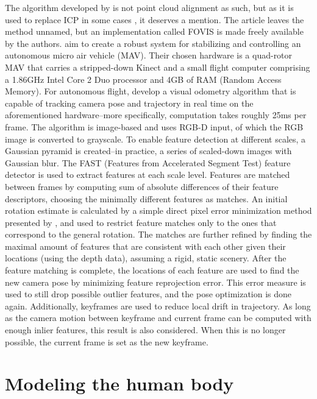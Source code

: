 The algorithm developed by \citet{huang2011visual} is not point cloud alignment as such, but as it is used to replace ICP in some cases \citep{Whelan12rssw}, it deserves a mention. The article leaves the method unnamed, but an implementation called FOVIS \citep{fovis} is made freely available by the authors. \citet{huang2011visual} aim to create a robust system for stabilizing and controlling an autonomous micro air vehicle (MAV). Their chosen hardware is a quad-rotor MAV that carries a stripped-down Kinect and a small flight computer comprising a 1.86GHz Intel Core 2 Duo processor and 4GB of RAM (Random Access Memory). For autonomous flight, \citeauthor{huang2011visual} develop a visual odometry algorithm that is capable of tracking camera pose and trajectory in real time on the aforementioned hardware--more specifically, computation takes roughly 25ms per frame. The algorithm is image-based and uses RGB-D input, of which the RGB image is converted to grayscale. To enable feature detection at different scales, a Gaussian pyramid is created--in practice, a series of scaled-down images with Gaussian blur. The FAST (Features from Accelerated Segment Test) feature detector \citep{rosten2006machine} is used to extract features at each scale level. Features are matched between frames by computing sum of absolute differences of their feature descriptors, choosing the minimally different features as matches. An initial rotation estimate is calculated by a simple direct pixel error minimization method presented by \citet{mei2009}, and used to restrict feature matches only to the ones that correspond to the general rotation. The matches are further refined by finding the maximal amount of features that are consistent with each other given their locations (using the depth data), assuming a rigid, static scenery. After the feature matching is complete, the locations of each feature are used to find the new camera pose by minimizing feature reprojection error. This error measure is used to still drop possible outlier features, and the pose optimization is done again. Additionally, keyframes are used to reduce local drift in trajectory. As long as the camera motion between keyframe and current frame can be computed with enough inlier features, this result is also considered. When this is no longer possible, the current frame is set as the new keyframe. \citep{huang2011visual}


\section{Modeling the human body}

